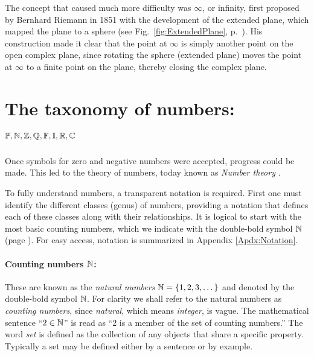 \documentclass{ximera}
\begin{document}
The concept that caused much more difficulty was $\infty$, or infinity, first proposed by Bernhard Riemann in 1851 with the
development of the extended plane, which mapped the plane to a sphere
(see Fig.~\ref{fig:ExtendedPlane}, p.~\pageref{fig:ExtendedPlane}). His construction made it clear that the point at $\infty$ is simply
another point on the open complex plane, since rotating the sphere (extended plane)
moves the point at $\infty$ to a finite point on the plane, thereby closing the complex plane.


\section {The taxonomy of numbers: $\mathbb{P}, \mathbb{N}, \mathbb{Z}, \mathbb{Q}, \mathbb{F}, \mathbb{I}, \mathbb{R}, \mathbb{C}$}%
\label{Lec 2}

Once symbols for zero and negative numbers were accepted, progress could be made. 
This led to the theory of numbers, today known as \emph{Number theory} \citep{HardyWright38,apostol2013}.

To fully understand numbers, a transparent notation is required. First one must identify the different classes (genus) of numbers, providing a notation that defines each of these
classes along with their relationships.
It is logical to start with the most basic counting numbers, which we indicate with the double-bold symbol $\mathbb{N}$ (page \pageref{Symbols}).
For easy access, notation is summarized in Appendix \ref{Apdx:Notation}.

\paragraph{Counting numbers $\mathbb{N}$:}
\label{page:bbN} 


These are known as the \emph{natural numbers} $\mathbb{N}= \{1, 2, 3, \dots\}$ and denoted by the double-bold symbol
$\mathbb{N}$.  For clarity we shall refer to the natural numbers as \emph{counting numbers}, since \emph{natural},
which means \emph{integer}, is vague.  The mathematical sentence ``$2 \in \mathbb{N}$'' is read as
``2 is a member of the set of counting numbers.''
The word \emph{set} is defined as the collection of any objects that share a specific property.
Typically a set may be defined either by a sentence or by example.
\end{document}
